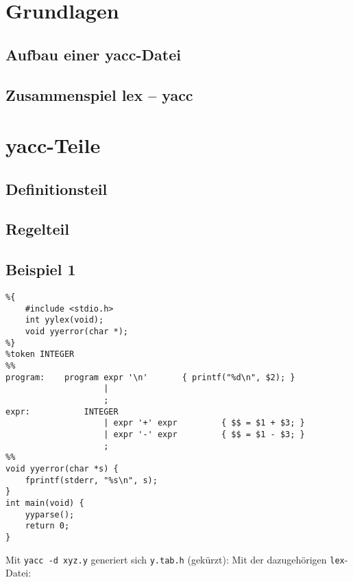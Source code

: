 \section{Grundlagen}
\subsection{Aufbau einer yacc-Datei}
\subsection{Zusammenspiel lex -- yacc}

\section{yacc-Teile}
\subsection{Definitionsteil}
\subsection{Regelteil}

\subsection{Beispiel 1}
\begin{lstlisting}
%{
	#include <stdio.h>
	int yylex(void);
	void yyerror(char *);
%}
%token INTEGER
%%
program:	program expr '\n'		{ printf("%d\n", $2); }
					|
					;
expr:			INTEGER
					| expr '+' expr			{ $$ = $1 + $3; }
					| expr '-' expr			{ $$ = $1 - $3; }
					;
%%
void yyerror(char *s) {
	fprintf(stderr, "%s\n", s);
}
int main(void) {
	yyparse();
	return 0;
}
\end{lstlisting}
Mit \lstinline`yacc -d xyz.y` generiert sich \lstinline`y.tab.h` (gekürzt):
Mit der dazugehörigen \lstinline`lex`-Datei:

